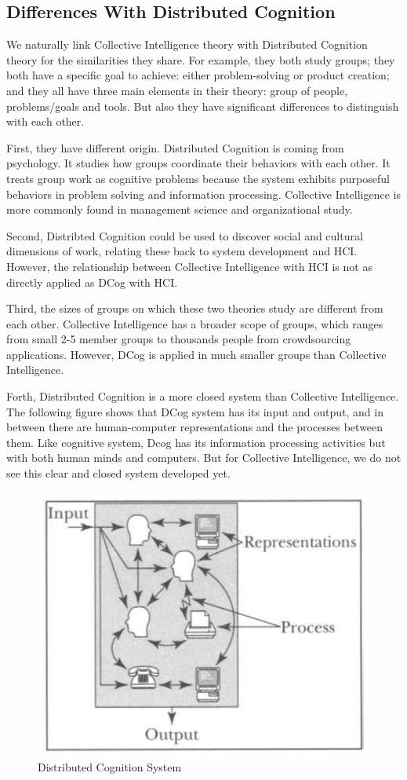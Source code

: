 \subsection{Differences With Distributed Cognition}
We naturally link Collective Intelligence theory with Distributed Cognition theory for the similarities they share. For example, they both study groups; they both have a specific goal to achieve: either problem-solving or product creation; and they all have three main elements in their theory: group of people, problems/goals and tools. But also they have significant differences to distinguish with each other.

First, they have different origin. Distributed Cognition is coming from psychology. It studies how groups coordinate their behaviors with each other. It treats group work as cognitive problems because the system exhibits purposeful behaviors in problem solving and information processing\cite{dcog}. Collective Intelligence is more commonly found in management science and organizational study. 

Second, Distribted Cognition could be used to discover social and cultural dimensions of work, relating these back to system development and HCI. However, the relationship between Collective Intelligence with HCI is not as directly applied as DCog with HCI.

Third, the sizes of groups on which these two theories study are different from each other. Collective Intelligence has a broader scope of groups, which ranges from small 2-5 member groups to thousands people from crowdsourcing applications. However, DCog is applied in much smaller groups than Collective Intelligence.

Forth, Distributed Cognition is a more closed system than Collective Intelligence. The following figure shows that DCog system has its input and output, and in between there are human-computer representations and the processes between them. Like cognitive system, Dcog has
its information processing activities but with both human minds and computers. But for Collective Intelligence, we do not see this clear and closed system developed yet.

\begin{figure}[!h]
\centering
\includegraphics[width=0.9\columnwidth]{figure/DCog}
\caption{Distributed Cognition System}
\label{fig:Dcog}
\end{figure}



